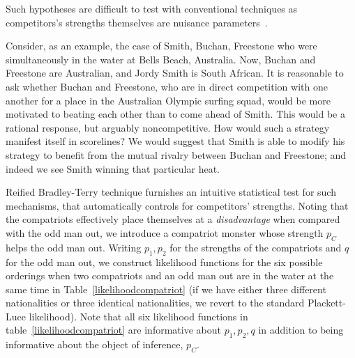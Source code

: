 \documentclass{article}
\begin{document}
Such hypotheses are difficult to test with conventional techniques as
competitors's strengths themselves are nuisance
parameters~\cite{basu1977}.

Consider, as an example, the case of Smith, Buchan, Freestone who were
simultaneously in the water at Bells Beach, Australia.  Now, Buchan
and Freestone are Australian, and Jordy Smith is South African.  It is
reasonable to ask whether Buchan and Freestone, who are in direct
competition with one another for a place in the Australian Olympic
surfing squad, would be more motivated to beating each other than to
come ahead of Smith.  This would be a rational response, but arguably
noncompetitive.  How would such a strategy manifest itself in
scorelines?  We would suggest that Smith is able to
modify his strategy to benefit from the mutual rivalry between
Buchan and Freestone; and indeed we see Smith winning that particular
heat.

Reified Bradley-Terry technique furnishes an intuitive statistical
test for such mechanisms, that automatically controls for competitors'
strengths.  Noting
that the compatriots effectively place themselves at a {\em
  disadvantage} when compared with the odd man out, we introduce a
compatriot monster whose strength $p_C$ helps the odd man out.
Writing $p_1, p_2$ for the strengths of the compatriots and $q$ for
the odd man out, we construct likelihood functions for the six
possible orderings when two compatriots and an odd man out are in the
water at the same time in Table~\ref{likelihoodcompatriot} (if we have
either three different nationalities or three identical nationalities,
we revert to the standard Plackett-Luce likelihood).  Note that all
six likelihood functions in table~\ref{likelihoodcompatriot} are
informative about $p_1,p_2,q$ in addition to being informative about
the object of inference, $p_C$.
\end{document}
